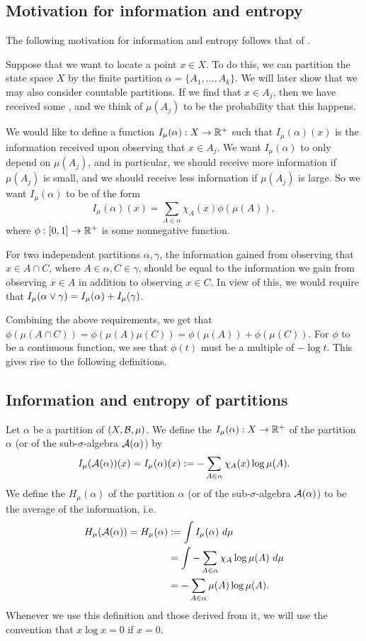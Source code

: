 \subsection{Motivation for information and entropy}
The following motivation for information and entropy follows that of \cite[Lecture 23]{ergodic-lectures}.

Suppose that we want to locate a point $x \in X$. To do this, we can partition the state space $X$ by the finite partition $\alpha = \{A_1, \dots, A_k\}$. We will later show that we may also consider countable partitions. If we find that $x \in A_j$, then we have received some , and we think of $\mu(A_j)$ to be the probability that this happens.

We would like to define a function $I_\mu(\alpha) : X \to \mathbb{R}^+$ such that $I_\mu(\alpha)(x)$ is the information received upon observing that $x \in A_j$. We want $I_\mu(\alpha)$ to only depend on $\mu(A_j)$, and in particular, we should receive more information if $\mu(A_j)$ is small, and we should receive less information if $\mu(A_j)$ is large. So we want $I_\mu(\alpha)$ to be of the form
\[
	I_\mu(\alpha)(x) = \sum_{A \in \alpha}{\chi_A(x)\phi(\mu(A))},
\]
where $\phi : [0, 1] \to \mathbb{R}^+$ is some nonnegative function.

For two independent partitions $\alpha, \gamma$, the information gained from observing that $x \in A \cap C$, where $A \in \alpha, C \in \gamma$, should be equal to the information we gain from observing $x \in A$ in addition to observing $x \in C$. In view of this, we would require that $I_\mu(\alpha \vee \gamma) = I_\mu(\alpha) + I_\mu(\gamma)$.

Combining the above requirements, we get that $\phi(\mu(A \cap C)) = \phi(\mu(A)\mu(C)) = \phi(\mu(A)) + \phi(\mu(C))$. For $\phi$ to be a continuous function, we see that $\phi(t)$ must be a multiple of $-\log{t}$. This gives rise to the following definitions.

\subsection{Information and entropy of partitions}
\begin{definition}
	Let $\alpha$ be a partition of $(X, \mathcal{B}, \mu)$. We define the  $I_\mu(\alpha) : X \to \mathbb{R}^+$ of the partition $\alpha$ (or of the sub-$\sigma$-algebra $\mathcal{A}(\alpha)$) by
	\[
		I_\mu(\mathcal{A}(\alpha))(x) = I_\mu(\alpha)(x) := -\sum_{A \in \alpha}{\chi_A(x) \log{\mu(A)}}.
	\]
	We define the  $H_\mu(\alpha)$ of the partition $\alpha$ (or of the sub-$\sigma$-algebra $\mathcal{A}(\alpha)$) to be the average of the information, i.e.
	\begin{align*}
		H_\mu(\A(\alpha)) = H_\mu(\alpha) &:= \int{I_\mu(\alpha)\ d\mu} \\
			&= \int{-\sum_{A \in \alpha}{\chi_A \log{\mu(A)}}\ d\mu} \\
			&= -\sum_{A \in \alpha}{\mu(A) \log{\mu(A)}}.
	\end{align*}
	Whenever we use this definition and those derived from it, we will use the convention that $x \log x = 0$ if $x = 0$.
\end{definition}

